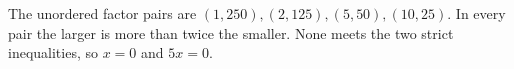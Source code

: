 The unordered factor pairs are $(1,250),(2,125),(5,50),(10,25)$. In every pair the larger is more than twice the smaller. None meets the two strict inequalities, so $ x=0 $ and $\boxed{5x=0}$.
